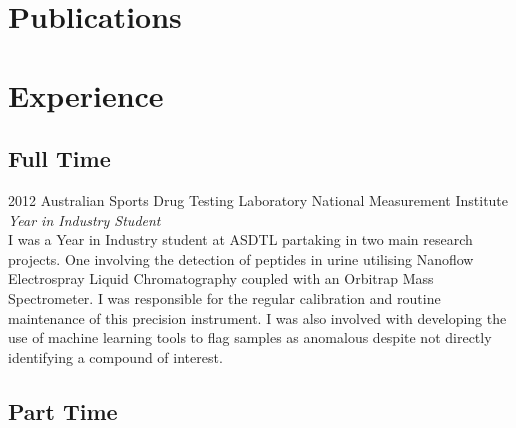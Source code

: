 \documentclass{friggeri-cv} %
\begin{document}
\section{Publications}




\section{Experience}

\subsection{Full Time}

\begin{entrylist}


\entry
{2012}
{Australian Sports Drug Testing Laboratory}
{National Measurement Institute}
{\emph{Year in Industry Student} \\
I was a Year in Industry student at ASDTL partaking in two main research projects. One involving the detection of peptides in urine utilising Nanoflow Electrospray Liquid Chromatography coupled with an Orbitrap Mass Spectrometer. I was responsible for the regular calibration and routine maintenance of this precision instrument. I was also involved with developing the use of machine learning tools to flag samples as anomalous despite not directly identifying a compound of interest.}


\end{entrylist}
\pagebreak
\subsection{Part Time}
\end{document}
